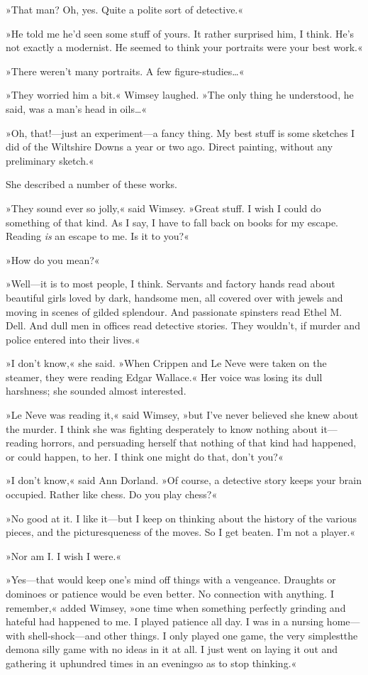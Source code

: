 »That man? Oh, yes. Quite a polite sort of detective.«

»He told me he'd seen some stuff of yours. It rather surprised him, I think. He's not exactly a modernist. He seemed to think your portraits were your best work.«

»There weren't many portraits. A few figure-studies\dots«

»They worried him a bit.« Wimsey laughed. »The only thing he understood, he said, was a man's head in oils\dots«

»Oh, that!—just an experiment—a fancy thing. My best stuff is some sketches I did of the Wiltshire Downs a year or two ago. Direct painting, without any preliminary sketch.«

She described a number of these works.

»They sound ever so jolly,« said Wimsey. »Great stuff. I wish I could do something of that kind. As I say, I have to fall back on books for my escape. Reading \textit{is} an escape to me. Is it to you?«

»How do you mean?«

»Well—it is to most people, I think. Servants and factory hands read about beautiful girls loved by dark, handsome men, all covered over with jewels and moving in scenes of gilded splendour. And passionate spinsters read Ethel M. Dell. And dull men in offices read detective stories. They wouldn't, if murder and police entered into their lives.«

»I don't know,« she said. »When Crippen and Le Neve were taken on the steamer, they were reading Edgar Wallace.« Her voice was losing its dull harshness; she sounded almost interested.

»Le Neve was reading it,« said Wimsey, »but I've never believed she knew about the murder. I think she was fighting desperately to know nothing about it—reading horrors, and persuading herself that nothing of that kind had happened, or could happen, to her. I think one might do that, don't you?«

»I don't know,« said Ann Dorland. »Of course, a detective story keeps your brain occupied. Rather like chess. Do you play chess?«

»No good at it. I like it—but I keep on thinking about the history of the various pieces, and the picturesqueness of the moves. So I get beaten. I'm not a player.«

»Nor am I. I wish I were.«

»Yes—that would keep one's mind off things with a vengeance. Draughts or dominoes or patience would be even better. No connection with anything. I remember,« added Wimsey, »one time when something perfectly grinding and hateful had happened to me. I played patience all day. I was in a nursing home—with shell-shock—and other things. I only played one game, the very simplest\textellipsis  the demon\textellipsis  a silly game with no ideas in it at all. I just went on laying it out and gathering it up\textellipsis  hundred times in an evening\textellipsis  so as to stop thinking.«

